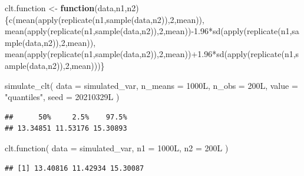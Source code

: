 \documentclass[
  11pt,
]{article}
\newenvironment{Shaded}{\begin{snugshade}}{\end{snugshade}}
\newcommand{\AttributeTok}[1]{\textcolor[rgb]{0.77,0.63,0.00}{#1}}
\newcommand{\ControlFlowTok}[1]{\textcolor[rgb]{0.13,0.29,0.53}{\textbf{#1}}}
\newcommand{\DecValTok}[1]{\textcolor[rgb]{0.00,0.00,0.81}{#1}}
\newcommand{\FloatTok}[1]{\textcolor[rgb]{0.00,0.00,0.81}{#1}}
\newcommand{\FunctionTok}[1]{\textcolor[rgb]{0.00,0.00,0.00}{#1}}
\newcommand{\NormalTok}[1]{#1}
\newcommand{\OtherTok}[1]{\textcolor[rgb]{0.56,0.35,0.01}{#1}}
\newcommand{\SpecialCharTok}[1]{\textcolor[rgb]{0.00,0.00,0.00}{#1}}
\newcommand{\StringTok}[1]{\textcolor[rgb]{0.31,0.60,0.02}{#1}}
\begin{document}
\begin{Shaded}
\begin{Highlighting}[]
\NormalTok{clt.function }\OtherTok{\textless{}{-}} \ControlFlowTok{function}\NormalTok{(data,n1,n2) \{}\FunctionTok{c}\NormalTok{(}\FunctionTok{mean}\NormalTok{(}\FunctionTok{apply}\NormalTok{(}\FunctionTok{replicate}\NormalTok{(n1,}\FunctionTok{sample}\NormalTok{(data,n2)),}\DecValTok{2}\NormalTok{,mean)),}
\FunctionTok{mean}\NormalTok{(}\FunctionTok{apply}\NormalTok{(}\FunctionTok{replicate}\NormalTok{(n1,}\FunctionTok{sample}\NormalTok{(data,n2)),}\DecValTok{2}\NormalTok{,mean))}\SpecialCharTok{{-}}\FloatTok{1.96}\SpecialCharTok{*}\FunctionTok{sd}\NormalTok{(}\FunctionTok{apply}\NormalTok{(}\FunctionTok{replicate}\NormalTok{(n1,}\FunctionTok{sample}\NormalTok{(data,n2)),}\DecValTok{2}\NormalTok{,mean)),}
\FunctionTok{mean}\NormalTok{(}\FunctionTok{apply}\NormalTok{(}\FunctionTok{replicate}\NormalTok{(n1,}\FunctionTok{sample}\NormalTok{(data,n2)),}\DecValTok{2}\NormalTok{,mean))}\SpecialCharTok{+}\FloatTok{1.96}\SpecialCharTok{*}\FunctionTok{sd}\NormalTok{(}\FunctionTok{apply}\NormalTok{(}\FunctionTok{replicate}\NormalTok{(n1,}\FunctionTok{sample}\NormalTok{(data,n2)),}\DecValTok{2}\NormalTok{,mean)))\}}
\end{Highlighting}
\end{Shaded}

\begin{Shaded}
\begin{Highlighting}[]
\FunctionTok{simulate\_clt}\NormalTok{(}
  \AttributeTok{data =}\NormalTok{ simulated\_var,}
  \AttributeTok{n\_means =}\NormalTok{ 1000L,}
  \AttributeTok{n\_obs =}\NormalTok{ 200L,}
  \AttributeTok{value =} \StringTok{"quantiles"}\NormalTok{,}
  \AttributeTok{seed =}\NormalTok{ 20210329L}
\NormalTok{)}
\end{Highlighting}
\end{Shaded}

\begin{verbatim}
##      50%     2.5%    97.5% 
## 13.34851 11.53176 15.30893
\end{verbatim}

\begin{Shaded}
\begin{Highlighting}[]
\FunctionTok{clt.function}\NormalTok{(}
  \AttributeTok{data =}\NormalTok{ simulated\_var,}
  \AttributeTok{n1 =}\NormalTok{ 1000L,}
  \AttributeTok{n2 =}\NormalTok{ 200L}
\NormalTok{)}
\end{Highlighting}
\end{Shaded}

\begin{verbatim}
## [1] 13.40816 11.42934 15.30087
\end{verbatim}
\end{document}

